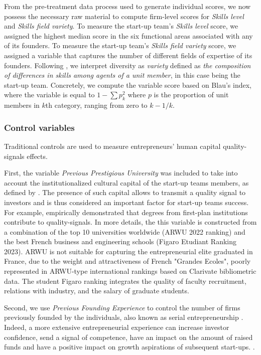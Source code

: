 \documentclass[12pt]{article}
\begin{document}
From the pre-treatment data process used to generate individual scores, we now possess the necessary raw material to compute firm-level scores for \textit{Skills level} and \textit{Skills field variety}. To measure the start-up team's \textit{Skills level} score, we assigned the highest median score in the six functional areas associated with any of its founders. To measure the start-up team's \textit{Skills field variety} score, we assigned a variable that captures the number of different fields of expertise of its founders. Following \citet{harrison2007s}, we interpret diversity as \textit{variety} defined as \textit{the composition of differences in skills among agents of a unit member}, in this case being the start-up team. Concretely, we compute the variable score based on Blau's index, where the variable is equal to $1-\sum p_k^2$ where $p$ is the proportion of unit members in $k$th category, ranging from zero to $k-1/k$.

\subsubsection{Control variables}

Traditional controls are used to measure entrepreneurs' human capital quality-signals effects.

First, the variable \textit{Previous Prestigious University} was included to take into account the institutionalized cultural capital of the start-up teams members, as defined by \citet{bourdieu1979distinction}. The presence of such capital allows to transmit a quality signal to investors and is thus considered an important factor for start-up teams success. For example, \citet{ferrary1999confiance} empirically demonstrated that degrees from first-plan institutions contribute to quality-signals. In more details, the this variable is constructed from a combination of the top 10 universities worldwide (ARWU 2022 ranking) and the best French business and engineering schools (Figaro Etudiant Ranking 2023). ARWU is not suitable for capturing the entrepreneurial elite graduated in France, due to the weight and attractiveness of French "Grandes Ecoles", poorly represented in ARWU-type international rankings based on Clarivate bibliometric data. The student Figaro ranking integrates the quality of faculty recruitment, relations with industry, and the salary of graduate students.

Second, we use \textit{Previous Founding Experience} to control the number of firms previously founded by the individuals, also known as serial entrepreneurship \citep{kirschenhofer2012performance}. Indeed, a more extensive entrepreneurial experience can increase investor confidence, send a signal of competence, have an impact on the amount of raised funds \citep{hsu2007experienced} and have a positive impact on growth aspirations of subsequent start-ups. \citep{fuentelsaz2023entrepreneurial}.
\end{document}
